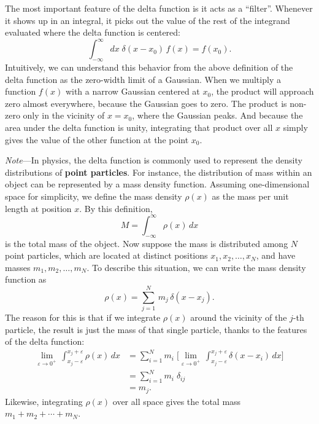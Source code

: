 \documentclass[10pt,a4paper]{article}
\begin{document}
The most important feature of the delta function is it acts as a
``filter''. Whenever it shows up in an integral, it picks out the value
of the rest of the integrand evaluated where the delta function is
centered:
\begin{equation}
\int_{-\infty}^\infty  dx \; \delta(x-x_0)\, f(x) = f(x_0).
\end{equation}
Intuitively, we can understand this behavior from the above definition
of the delta function as the zero-width limit of a Gaussian. When we
multiply a function $f(x)$ with a narrow Gaussian centered at $x_0$,
the product will approach zero almost everywhere, because the Gaussian
goes to zero. The product is non-zero only in the vicinity of
$x = x_0$, where the Gaussian peaks. And because the area under the
delta function is unity, integrating that product over all $x$ simply
gives the value of the other function at the point $x_0$.

\begin{framed} \noindent
  \textit{Note}---In physics, the delta function is commonly used to
  represent the density distributions of \textbf{point particles}. For
  instance, the distribution of mass within an object can be
  represented by a mass density function. Assuming one-dimensional
  space for simplicity, we define the mass density $\rho(x)$ as the
  mass per unit length at position $x$. By this definition,
  \begin{equation*}
    M = \int_{-\infty}^\infty \rho(x)\, dx
  \end{equation*}
  is the total mass of the object. Now suppose the mass is distributed
  among $N$ point particles, which are located at distinct positions
  $x_1, x_2, \dots, x_N$, and have masses $m_1, m_2, \dots, m_N$.  To
  describe this situation, we can write the mass density function
  as
  \begin{equation*}
    \rho(x) = \sum_{j=1}^N \, m_j\, \delta(x-x_j).  
  \end{equation*}
  The reason for this is that if we integrate $\rho(x)$ around the
  vicinity of the $j$-th particle, the result is just the mass of that
  single particle, thanks to the features of the delta function:
  \begin{align*}
    \lim_{\varepsilon\rightarrow 0^+}\, \int_{x_j - \varepsilon}^{x_j + \varepsilon} \rho(x) \, dx &= \sum_{i=1}^N m_i\; \Big[\lim_{\varepsilon\rightarrow 0^+}\, \int_{x_j - \varepsilon}^{x_j + \varepsilon} \delta(x-x_i) \,dx\Big]\\ &= \sum_{i=1}^N m_i\; \delta_{ij} \\ &= m_j.
  \end{align*}
  Likewise, integrating $\rho(x)$ over all space gives the total mass
  $m_1 + m_2 + \cdots + m_N$.
\end{framed}
\end{document}
